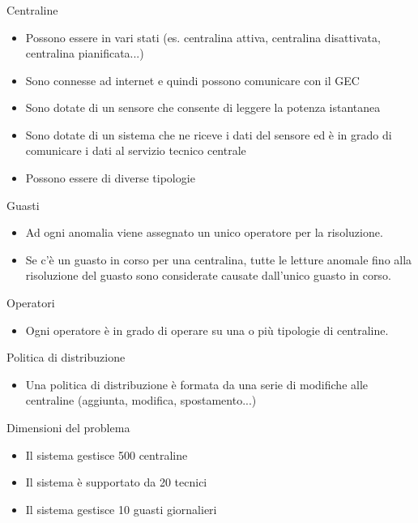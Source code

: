 \documentclass{beamer}
\begin{document}
	\begin{frame}[allowframebreaks]
		\frametitle{}
			\begin{block}{Centraline}
				\begin{itemize}
					\item Possono essere in vari stati (es. centralina attiva, centralina disattivata, centralina pianificata...)
					\item Sono connesse ad internet e quindi possono comunicare con il GEC
					\item Sono dotate di un sensore che consente di leggere la potenza istantanea
					\item Sono dotate di un sistema che ne riceve i dati del sensore ed è in grado di comunicare i dati al servizio tecnico centrale
					\item Possono essere di diverse tipologie
				\end{itemize}
			\end{block}
			\begin{block}{Guasti}
					\begin{itemize}
						\item Ad ogni anomalia viene assegnato un unico operatore per la risoluzione.
						\item Se c'è un guasto in corso per una centralina, tutte le letture anomale fino alla risoluzione del guasto sono considerate causate dall'unico guasto in corso.
					\end{itemize}
			\end{block}
			\begin{block}{Operatori}
				\begin{itemize}
					\item Ogni operatore è in grado di operare su una o più tipologie di centraline.
				\end{itemize}
			\end{block}
			\begin{block}{Politica di distribuzione}
				\begin{itemize}
					\item Una politica di distribuzione è formata da una serie di modifiche alle centraline (aggiunta, modifica, spostamento...)
				\end{itemize}
			\end{block}
			\begin{block}{Dimensioni del problema}
				\begin{itemize}
					\item Il sistema gestisce 500 centraline
					\item Il sistema è supportato da 20 tecnici
					\item Il sistema gestisce 10 guasti giornalieri
				\end{itemize}
			\end{block}
	\end{frame}
	
\end{document}
